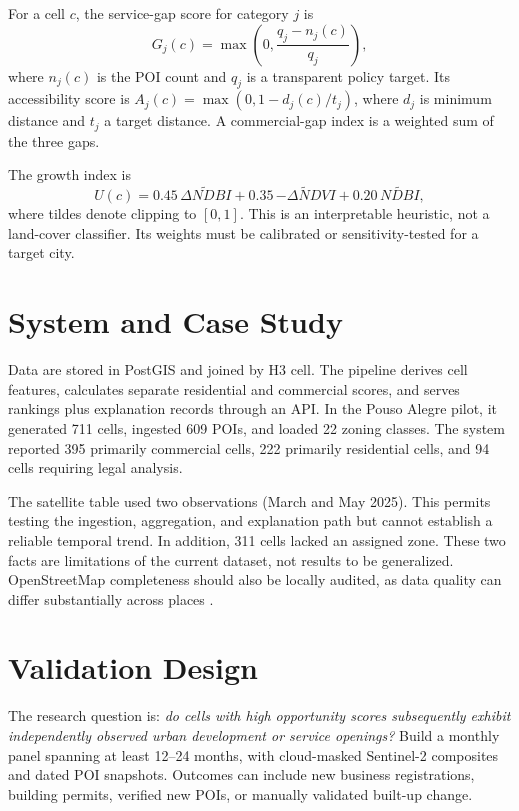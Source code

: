 \documentclass[conference]{IEEEtran}
\begin{document}
For a cell $c$, the service-gap score for category $j$ is
\begin{equation}
G_j(c)=\max\left(0,\frac{q_j-n_j(c)}{q_j}\right),
\end{equation}
where $n_j(c)$ is the POI count and $q_j$ is a transparent policy target. Its accessibility score is $A_j(c)=\max(0,1-d_j(c)/t_j)$, where $d_j$ is minimum distance and $t_j$ a target distance. A commercial-gap index is a weighted sum of the three gaps.

The growth index is
\begin{equation}
U(c)=0.45\,\widetilde{\Delta NDBI}+0.35\,\widetilde{-\Delta NDVI}+0.20\,\widetilde{NDBI},
\end{equation}
where tildes denote clipping to $[0,1]$. This is an interpretable heuristic, not a land-cover classifier. Its weights must be calibrated or sensitivity-tested for a target city.

\section{System and Case Study}
Data are stored in PostGIS and joined by H3 cell. The pipeline derives cell features, calculates separate residential and commercial scores, and serves rankings plus explanation records through an API. In the Pouso Alegre pilot, it generated 711 cells, ingested 609 POIs, and loaded 22 zoning classes. The system reported 395 primarily commercial cells, 222 primarily residential cells, and 94 cells requiring legal analysis.

The satellite table used two observations (March and May 2025). This permits testing the ingestion, aggregation, and explanation path but cannot establish a reliable temporal trend. In addition, 311 cells lacked an assigned zone. These two facts are limitations of the current dataset, not results to be generalized. OpenStreetMap completeness should also be locally audited, as data quality can differ substantially across places \cite{haklay2010osm}.

\section{Validation Design}
The research question is: \emph{do cells with high opportunity scores subsequently exhibit independently observed urban development or service openings?} Build a monthly panel spanning at least 12--24 months, with cloud-masked Sentinel-2 composites and dated POI snapshots. Outcomes can include new business registrations, building permits, verified new POIs, or manually validated built-up change.
\end{document}
